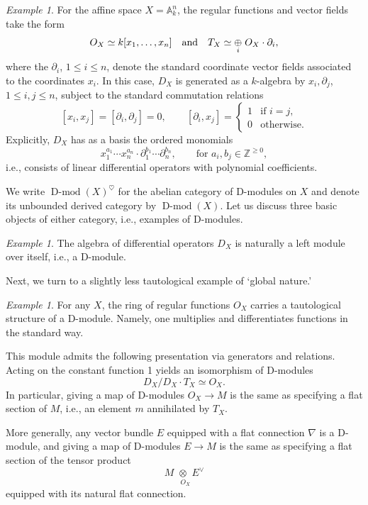 \documentclass[10pt]{amsart}
\newcommand{\on}{\operatorname}
\theoremstyle{remark}
\newtheorem{ex}[subsubsection]{Example}
\numberwithin{equation}{section}
\begin{document}
	
	\begin{ex} For the affine space $X = \mathbb{A}^n_k$, the regular functions 
	and vector fields take the form 
		\[
		O_X \simeq k[x_1, \ldots, x_n] \quad \text{and} \quad T_X \simeq 
		\underset{i}{\oplus} \hspace{1mm} O_X \cdot \partial_i, 
		\]
		where the $\partial_i$, $1 \leqslant i \leqslant n$, denote the standard 
		coordinate vector fields associated to the coordinates $x_i$. In this case, $D_X$ 
		is generated as a $k$-algebra by $x_i, \partial_j$, $1 \leqslant i,j 
		\leqslant n$, subject to the standard commutation relations 
		\[
		[x_i, x_j] = [\partial_i, \partial_j] = 0, \quad \quad [\partial_i, 
		x_j] = \begin{cases} 1 & \text{if } i = j, \\ 0 & \text{otherwise}. 
		\end{cases}
		\]
		Explicitly, $D_X$ has as a basis the ordered monomials 
		\[
		x_1^{a_1}    \cdots  x_n^{a_n} \cdot \partial_1^{b_1} \cdots 
		\partial_n^{b_n}, \quad \quad \text{for } a_i, b_j \in 
		\mathbb{Z}^{\geqslant 0}, 
		\]
		i.e., consists of linear differential operators with polynomial 
		coefficients. 

	\end{ex}
	
   We write $\on{D-mod}(X)^\heartsuit$ for the abelian category 
	of D-modules on $X$ and denote its unbounded derived category by 
	$\on{D-mod}(X)$. Let us discuss three basic objects of either category, i.e., examples of D-modules. 
	
	\begin{ex} The algebra of differential operators ${D}_X$ is naturally a 
	left module over itself, i.e., a D-module. 
	\end{ex}
	
	Next, we turn to a slightly less tautological example of `global nature.' 
	
	\begin{ex} For any $X$, the ring of regular functions $O_X$ carries a 
	tautological structure of a D-module. Namely, one multiplies and 
	differentiates functions in the standard way. 
		
		
		This module admits the following presentation via generators and relations. 
		Acting on the constant function 1 yields an isomorphism of D-modules
		\[
		D_X/ D_X \cdot T_X \simeq O_X. 
		\]
		In particular, giving a map of D-modules $O_X \rightarrow M$ is the 
		same as specifying a flat section of $M$, i.e., an element $m$ 
		annihilated by $T_X$. 
		
		
		More generally, any vector bundle $E$ equipped with a flat connection 
		$\nabla$ is a D-module, and giving a map of D-modules $E \rightarrow 
		M$ is the same as specifying a flat section of the tensor product$$M 
		\underset{\phantom{ii} O_X} \otimes E^\vee$$equipped with its natural flat connection. \end{ex}
	
\end{document}
